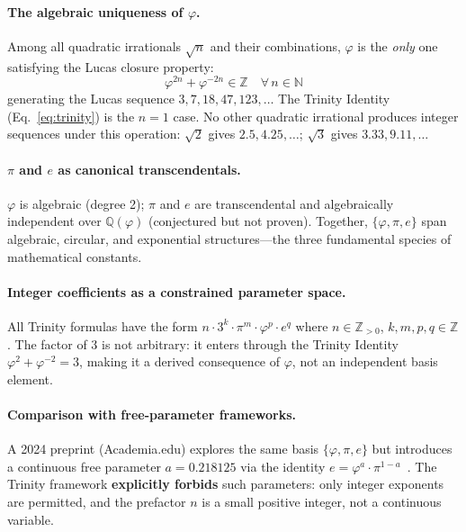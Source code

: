 \documentclass[10pt,a4paper]{article}
\begin{document}
\paragraph{The algebraic uniqueness of $\varphi$.}
Among all quadratic irrationals $\sqrt{n}$ and their combinations, $\varphi$ is the \emph{only} one
satisfying the Lucas closure property:
\begin{equation}
  \varphi^{2n} + \varphi^{-2n} \in \mathbb{Z} \quad \forall\, n \in \mathbb{N}
  \label{eq:lucas}
\end{equation}
generating the Lucas sequence $3, 7, 18, 47, 123, \ldots$ The Trinity Identity (Eq.~\ref{eq:trinity})
is the $n=1$ case. No other quadratic irrational produces integer sequences under this operation:
$\sqrt{2}$ gives $2.5, 4.25, \ldots$; $\sqrt{3}$ gives $3.33, 9.11, \ldots$

\paragraph{$\pi$ and $e$ as canonical transcendentals.}
$\varphi$ is algebraic (degree 2); $\pi$ and $e$ are transcendental and algebraically independent
over $\mathbb{Q}(\varphi)$ (conjectured but not proven). Together, $\{\varphi, \pi, e\}$ span
algebraic, circular, and exponential structures---the three fundamental species of mathematical
constants.

\paragraph{Integer coefficients as a constrained parameter space.}
All Trinity formulas have the form $n \cdot 3^k \cdot \pi^m \cdot \varphi^p \cdot e^q$ where
$n \in \mathbb{Z}_{>0}$, $k, m, p, q \in \mathbb{Z}$. The factor of 3 is not arbitrary: it
enters through the Trinity Identity $\varphi^2 + \varphi^{-2} = 3$, making it a derived
consequence of $\varphi$, not an independent basis element.

\paragraph{Comparison with free-parameter frameworks.}
A 2024 preprint (Academia.edu) explores the same basis $\{\varphi, \pi, e\}$ but introduces a
continuous free parameter $a = 0.218125$ via the identity $e = \varphi^a \cdot \pi^{1-a}$~\cite{aca2024}.
The Trinity framework \textbf{explicitly forbids} such parameters: only integer exponents are permitted,
and the prefactor $n$ is a small positive integer, not a continuous variable.
\end{document}
